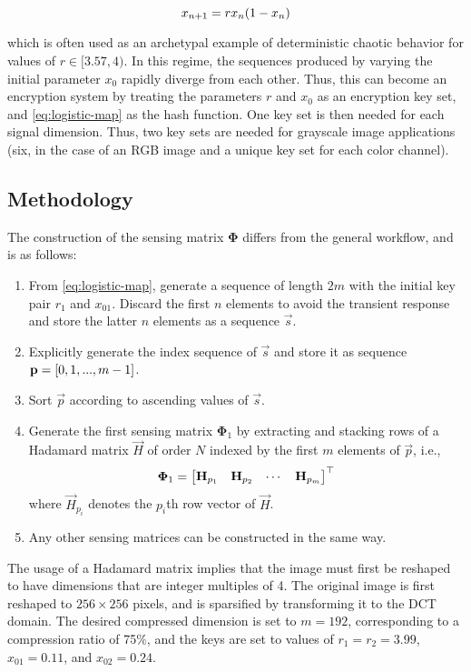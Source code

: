 \begin{equation}\label{eq:logistic-map}
	x_{n+1} = r x_n \qty(1 - x_n)
\end{equation}

\noindent which is often used as an archetypal example of deterministic chaotic behavior for values of $r \in [3.57, 4)$. In this regime, the sequences produced by varying the initial parameter $x_0$ rapidly diverge from each other. Thus, this can become an encryption system by treating the parameters $r$ and $x_0$ as an encryption key set, and \eqref{eq:logistic-map} as the hash function. One key set is then needed for each signal dimension. Thus, two key sets are needed for grayscale image applications (six, in the case of an RGB image and a unique key set for each color channel). 

\subsection{Methodology}
\label{ssec:image-encrypt-metho}
The construction of the sensing matrix $\bm\Phi$ differs from the general workflow, and is as follows:

\begin{enumerate}
	\item From \eqref{eq:logistic-map}, generate a sequence of length $2m$ with the initial key pair $r_1$ and $x_{01}$. Discard the first $n$ elements to avoid the transient response and store the latter $n$ elements as a sequence $\vec{s}$.
	\item Explicitly generate the index sequence of $\vec{s}$ and store it as sequence $\text{\bfseries p} = \qty[0, 1, ..., m-1]$.
	\item Sort $\vec{p}$ according to ascending values of $\vec{s}$.
	\item Generate the first sensing matrix $\bm\Phi_1$ by extracting and stacking rows of a Hadamard matrix $\vec{H}$ of order $N$ indexed by the first $m$ elements of $\vec{p}$, i.e.,
	\begin{equation}\label{eq:construct-hadamard}
		\bm\Phi_1 = \mqty[
			\vec{H}_{p_1} & \vec{H}_{p_2} & \cdots & \vec{H}_{p_m}
		]^\top
	\end{equation}
	\noindent where $\vec{H}_{p_i}$ denotes the $p_i$th row vector of $\vec{H}$.
	\item Any other sensing matrices can be constructed in the same way.
\end{enumerate}

The usage of a Hadamard matrix implies that the image must first be reshaped to have dimensions that are integer multiples of 4. The original image is first reshaped to $256 \times 256$ pixels, and is sparsified by transforming it to the DCT domain. The desired compressed dimension is set to $m = 192$, corresponding to a compression ratio of 75\%, and the keys are set to values of $r_1 = r_2 = 3.99$, $x_{01} = 0.11$, and $x_{02} = 0.24$.

